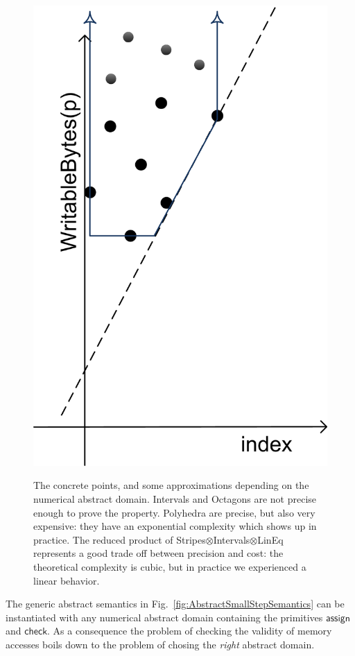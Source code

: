 \documentclass[10pt]{sigplanconf}
\begin{document}
\begin{figure}[t]
{   \includegraphics[scale=.57]{stripes.png}
   \label{fig:stripes}
   }
\caption{The concrete points, and some approximations depending on the numerical abstract domain.
Intervals and Octagons are not precise enough to prove the property.
Polyhedra are precise, but also very expensive: they have an exponential complexity which shows up in practice.
The reduced product of Stripes$\otimes$Intervals$\otimes$LinEq represents a good trade off between precision and cost: the theoretical complexity is cubic, but in practice we experienced a linear behavior. 
}
\label{fig:exampleDomains}
\end{figure}


The generic abstract semantics in Fig.~\ref{fig:AbstractSmallStepSemantics} can be instantiated with any numerical abstract domain containing the primitives $\mathsf{assign}$ and $\mathsf{check}$.
As a consequence the problem of checking the validity of memory accesses boils down to the problem of chosing the \emph{right} abstract domain. 
\end{document}
